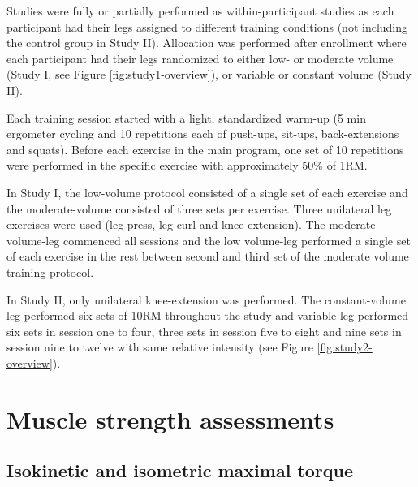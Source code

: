 \documentclass[twoside,10pt]{gihclass} %
\begin{document}
Studies were fully or partially performed as within-participant studies
as each participant had their legs assigned to different training
conditions (not including the control group in Study II). Allocation was
performed after enrollment where each participant had their legs
randomized to either low- or moderate volume (Study I, see Figure \ref{fig:study1-overview}), or variable or constant volume (Study II).

Each training session started with a light, standardized warm-up (5 min
ergometer cycling and 10 repetitions each of push-ups, sit-ups,
back-extensions and squats). Before each exercise in the main program,
one set of 10 repetitions were performed in the specific exercise with
approximately 50\% of 1RM.

In Study I, the low-volume protocol consisted of a single set of each
exercise and the moderate-volume consisted of three sets per exercise.
Three unilateral leg exercises were used (leg press, leg curl and knee
extension). The moderate volume-leg commenced all sessions and the low
volume-leg performed a single set of each exercise in the rest between
second and third set of the moderate volume training protocol.

In Study II, only unilateral knee-extension was performed. The constant-volume leg performed six sets of 10RM throughout the study and variable leg performed six sets in session one to four, three sets in session five to eight and nine sets in session nine to twelve with same relative intensity (see Figure \ref{fig:study2-overview}).

\hypertarget{muscle-strength-assessments}{%
\section{Muscle strength assessments}\label{muscle-strength-assessments}}

\hypertarget{isokinetic-and-isometric-maximal-torque}{%
\subsection{Isokinetic and isometric maximal torque}\label{isokinetic-and-isometric-maximal-torque}}
\end{document}
